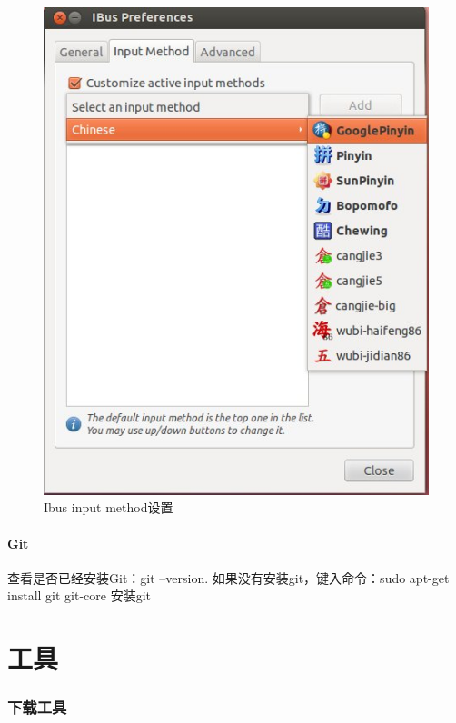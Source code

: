 \documentclass[paper=a4,fontsize=11pt]{article}
\begin{document}
\begin{enumerate}
		\begin{figure}[htbp]
			\centering
			\includegraphics[scale=0.7]{IbusSetupGooglePinyin.jpeg}
			\caption{Ibus input method设置}
			\label{IbusSetupGooglePinyin}
		\end{figure}
		
		
	\end{enumerate}
	
	\subsection{Git}
	
	查看是否已经安装Git：git --version.
	如果没有安装git，键入命令：sudo apt-get install git git-core 安装git
	
	
	
	
	
	\clearpage
		
	\part{工具}
	
	\clearpage
	
	\section{下载工具}	
\end{document}
